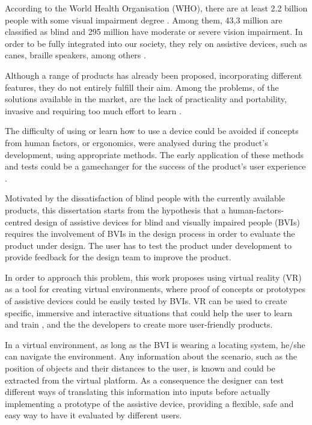 

According to the World Health Organisation (WHO), there are at least 2.2 billion people with some visual impairment degree \cite{world2019world}. Among them, 43,3 million are classified as blind and 295 million have moderate or severe vision impairment. In order to be fully integrated into our society, they rely on assistive devices, such as canes, braille speakers, among others \cite{bourne2021trends}. 

Although a range of products has already been proposed, incorporating different features, they do not entirely fulfill their aim. Among the problems, of the solutions available in the market, are the lack of practicality and portability, invasive and requiring too much effort to learn \cite{lozano2009electrotactile}.

The difficulty of using or learn how to use a device could be avoided if concepts from human factors, or ergonomics, were analysed during the product’s development, using appropriate methods. The early application of these methods and tests could be a gamechanger for the success of the product's user experience \cite{wolf2019towards}.

Motivated by the dissatisfaction of blind people with the currently available products, this dissertation starts from the hypothesis that a human-factors-centred design of assistive devices for blind and visually impaired people (BVIs) requires the involvement of BVIs in the design process in order to evaluate the product under design. The user has to test the product under development to provide feedback for the design team to improve the product.

In order to approach this problem, this work proposes using virtual reality (VR) as a tool for creating virtual environments, where proof of concepts or prototypes of assistive devices could be easily tested by BVIs. VR can be used to create specific, immersive and interactive situations that could help the user to learn and train \cite{farrell2018learning}, and the the developers to create more user-friendly products.

In a virtual environment, as long as the BVI is wearing a locating system, he/she can navigate the environment. Any information about the scenario, such as the position of objects and their distances to the user, is known and could be extracted from the virtual platform. As a consequence the designer can test different ways of translating this information into inputs before actually implementing a prototype of the assistive device, providing a flexible, safe and easy way to have it evaluated by different users.


